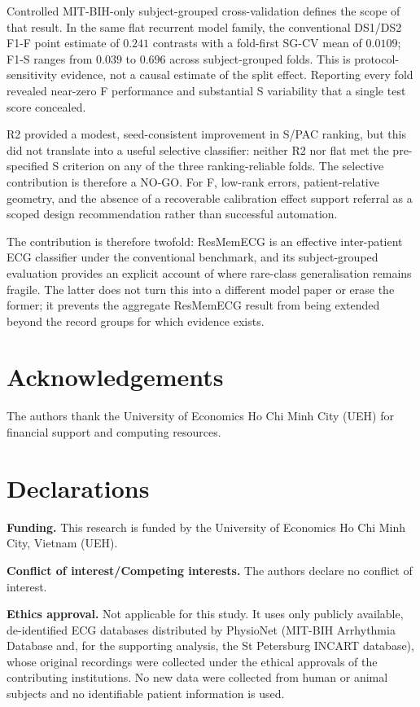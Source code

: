 \documentclass[pdflatex,sn-mathphys-num]{sn-jnl}
\begin{document}
Controlled MIT-BIH-only subject-grouped cross-validation defines the scope of
that result. In the same flat recurrent model family, the conventional DS1/DS2
F1-F point estimate of $0.241$ contrasts with a fold-first SG-CV mean of
$0.0109$; F1-S ranges from $0.039$ to $0.696$ across subject-grouped folds.
This is protocol-sensitivity evidence, not a causal estimate of the split effect.
Reporting every fold revealed near-zero F performance and substantial S
variability that a single test score concealed.

R2 provided a modest, seed-consistent improvement in S/PAC ranking, but this did
not translate into a useful selective classifier: neither R2 nor flat met the
pre-specified S criterion on any of the three ranking-reliable folds. The
selective contribution is therefore a NO-GO. For F, low-rank errors,
patient-relative geometry, and the absence of a recoverable calibration effect
support referral as a scoped design recommendation rather than successful
automation.

The contribution is therefore twofold: ResMemECG is an effective inter-patient
ECG classifier under the conventional benchmark, and its subject-grouped
evaluation provides an explicit account of where rare-class generalisation
remains fragile. The latter does not turn this into a different model paper or
erase the former; it prevents the aggregate ResMemECG result from being
extended beyond the record groups for which evidence exists.

\section*{Acknowledgements}
The authors thank the University of Economics Ho Chi Minh City (UEH) for
financial support and computing resources.
\section*{Declarations}
\textbf{Funding.} This research is funded by the University of Economics Ho Chi Minh City, Vietnam (UEH).

\textbf{Conflict of interest/Competing interests.} The authors declare no conflict of interest.

\textbf{Ethics approval.} Not applicable for this study. It uses only publicly
available, de-identified ECG databases distributed by PhysioNet (MIT-BIH
Arrhythmia Database and, for the supporting analysis, the St Petersburg INCART
database), whose original recordings were collected under the ethical approvals
of the contributing institutions. No new data were collected from human or
animal subjects and no identifiable patient information is used.
\end{document}
